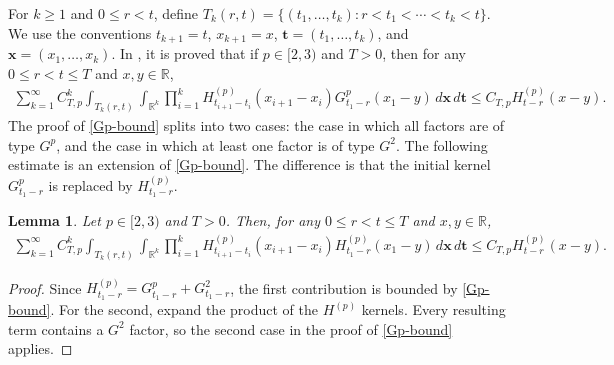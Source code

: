 \documentclass[10pt,a4paper]{amsart}
\newtheorem{lemma}[theorem]{Lemma}
\def\bR{\mathbb{R}}
\begin{document}
\medskip




For $k\ge1$ and $0\le r<t$, define
$T_k(r,t)=\{(t_1,\ldots,t_k):r<t_1<\cdots<t_k<t\}$. We use the
conventions $t_{k+1}=t$, $x_{k+1}=x$,
$\pmb{t}=(t_1,\ldots,t_k)$, and $\pmb{x}=(x_1,\ldots,x_k)$.
In \cite{BLW26},  it is proved that if $p\in[2,3)$ and
$T>0$, then for any $0\le r<t\le T$ and $x,y\in\bR$,
\begin{align}
\label{Gp-bound}
\sum_{k=1}^{\infty}
C_{T,p}^k
\int_{T_k(r,t)}
\int_{\bR^k}
\prod_{i=1}^{k}
H_{t_{i+1}-t_i}^{(p)}(x_{i+1}-x_i)
G_{t_1-r}^p(x_1-y)
\,d\pmb{x}\,d\pmb{t}
\le
C_{T,p}H_{t-r}^{(p)}(x-y).
\end{align}
The proof of \eqref{Gp-bound} splits into two cases:
the case in which all factors are of type $G^p$, and the
case in which at least one factor is of type $G^2$.
The following estimate is an extension of
\eqref{Gp-bound}. The difference is that the initial kernel
$G_{t_1-r}^p$ is replaced by $H_{t_1-r}^{(p)}$.


\begin{lemma}
Let $p\in[2,3)$ and $T>0$. Then, for any $0\le r<t\le T$ and
$x,y\in\bR$,
\begin{align}
\label{GpG2-bound}
\sum_{k=1}^{\infty}
C_{T,p}^k
\int_{T_k(r,t)}
\int_{\bR^k}
\prod_{i=1}^{k}
H_{t_{i+1}-t_i}^{(p)}(x_{i+1}-x_i)
H_{t_1-r}^{(p)}(x_1-y)
\,d\pmb{x}\,d\pmb{t}
\le
C_{T,p}
H_{t-r}^{(p)}(x-y).
\end{align}
\end{lemma}

\begin{proof}
 Since $H_{t_1-r}^{(p)}=G_{t_1-r}^p+G_{t_1-r}^2$, the first
contribution is bounded by \eqref{Gp-bound}. For the second, expand the product
of the $H^{(p)}$ kernels. Every resulting term contains a $G^2$ factor, so the
second case in the proof of \eqref{Gp-bound} applies.
\end{proof}
\end{document}
